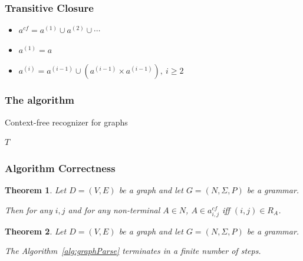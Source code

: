 \documentclass[xcolor=table]{beamer}
\newtheorem{mytheorem}{Theorem}
\begin{document}
\begin{frame}
  \transwipe[direction=90]
  \frametitle{Transitive Closure}
  \begin{itemize}
    \item $a^{cf} = a^{(1)} \cup a^{(2)} \cup \cdots$
    \item $a^{(1)} = a$
    \item $a^{(i)} = a^{(i-1)} \cup (a^{(i-1)} \times a^{(i-1)}), ~i \ge 2$
  \end{itemize}
\end{frame}

\begin{frame}
  \transwipe[direction=90]
  \frametitle{The algorithm}

\begin{algorithm}[H]
\begin{algorithmic}[1]
\caption{Context-free recognizer for graphs}
\label{alg:graphParse}
    
    \EndFor    
       
    \EndWhile
\State \Return $T$
\EndFunction
\end{algorithmic}
\end{algorithm}

\end{frame}

\begin{frame}
  \transwipe[direction=90]
  \frametitle{Algorithm Correctness}
\begin{mytheorem}
 Let $D = (V,E)$ be a graph and let $G =(N,\Sigma,P)$ be a grammar. 
 
 Then for any $i, j$ and for any non-terminal $A \in N$, $A \in a^{cf}_{i,j}$ iff $(i,j) \in R_A$.
\end{mytheorem}


\begin{mytheorem}
 Let $D = (V,E)$ be a graph and let $G =(N,\Sigma,P)$ be a grammar. 
 
 The Algorithm~\ref{alg:graphParse} terminates in a finite number of steps. 
\end{mytheorem}
\end{frame}
\end{document}
